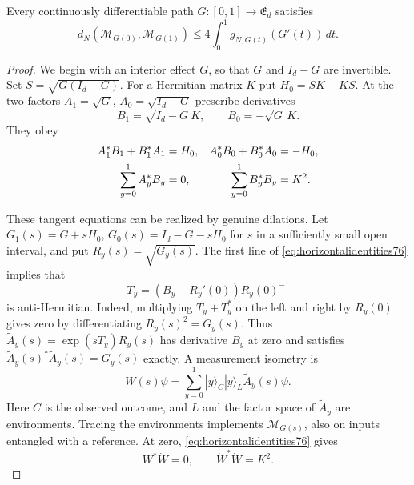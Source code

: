 \begin{lemma}
\label{lem:matrixpath76}
Every continuously differentiable path $G:[0,1]\to\mathfrak E_d$
satisfies
\begin{equation}\label{eq:matrixpath76}
 d_N(\mathcal M_{G(0)},\mathcal M_{G(1)})
       \le4\int_0^1 g_{N,G(t)}(G'(t))\,dt.
\end{equation}
\end{lemma}
\begin{proof}
We begin with an interior effect $G$, so that $G$ and $I_d-G$
are invertible.  Set $S=\sqrt{G(I_d-G)}$.  For a Hermitian matrix
$K$ put $H_0=SK+KS$.  At the two factors
$A_1=\sqrt G$, $A_0=\sqrt{I_d-G}$ prescribe derivatives
\begin{equation}\label{eq:horizontalderivatives76}
 B_1=\sqrt{I_d-G}\,K,\qquad B_0=-\sqrt G\,K.
\end{equation}
They obey
\begin{align}
 A_1^*B_1+B_1^*A_1&=H_0,&
 A_0^*B_0+B_0^*A_0&=-H_0,\notag\\
 \sum_{y=0}^1 A_y^*B_y&=0,&
 \sum_{y=0}^1 B_y^*B_y&=K^2.
                                      \label{eq:horizontalidentities76}
\end{align}

These tangent equations can be realized by genuine dilations.
Let $G_1(s)=G+sH_0$, $G_0(s)=I_d-G-sH_0$ for $s$ in a
sufficiently small open interval, and put $R_y(s)=\sqrt{G_y(s)}$.
The first line of \eqref{eq:horizontalidentities76} implies that
\[
 T_y=(B_y-R_y'(0))R_y(0)^{-1}
\]
is anti-Hermitian.  Indeed, multiplying $T_y+T_y^*$ on the left
and right by $R_y(0)$ gives zero by differentiating
$R_y(s)^2=G_y(s)$.  Thus
$\widetilde A_y(s)=\exp(sT_y)R_y(s)$ has derivative $B_y$ at
zero and satisfies
$\widetilde A_y(s)^*\widetilde A_y(s)=G_y(s)$ exactly.  A measurement
isometry is
\[
 W(s)\psi=\sum_{y=0}^1
              |y\rangle_C|y\rangle_L\widetilde A_y(s)\psi.
\]
Here $C$ is the observed outcome, and $L$ and the factor space of
$\widetilde A_y$ are environments.  Tracing the environments
implements $\mathcal M_{G(s)}$, also on inputs entangled with a
reference.  At zero, \eqref{eq:horizontalidentities76} gives
\begin{equation}\label{eq:horizontaloverlap76}
 W^*\dot W=0,\qquad \dot W^*\dot W=K^2.
\end{equation}


\end{proof}
